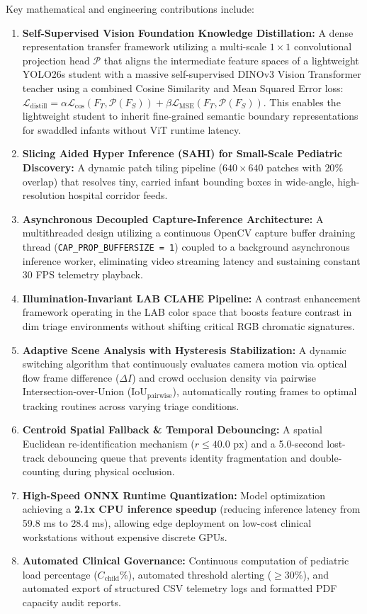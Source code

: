 Key mathematical and engineering contributions include:
\begin{enumerate}
    \item \textbf{Self-Supervised Vision Foundation Knowledge Distillation:} A dense representation transfer framework utilizing a multi-scale $1\times 1$ convolutional projection head $\mathcal{P}$ that aligns the intermediate feature spaces of a lightweight YOLO26s student with a massive self-supervised DINOv3 Vision Transformer teacher using a combined Cosine Similarity and Mean Squared Error loss: $\mathcal{L}_{\text{distill}} = \alpha \mathcal{L}_{\text{cos}}(F_T, \mathcal{P}(F_S)) + \beta \mathcal{L}_{\text{MSE}}(F_T, \mathcal{P}(F_S))$. This enables the lightweight student to inherit fine-grained semantic boundary representations for swaddled infants without ViT runtime latency.
    \item \textbf{Slicing Aided Hyper Inference (SAHI) for Small-Scale Pediatric Discovery:} A dynamic patch tiling pipeline ($640\times 640$ patches with $20\%$ overlap) that resolves tiny, carried infant bounding boxes in wide-angle, high-resolution hospital corridor feeds.
    \item \textbf{Asynchronous Decoupled Capture-Inference Architecture:} A multithreaded design utilizing a continuous OpenCV capture buffer draining thread (\texttt{CAP\_PROP\_BUFFERSIZE = 1}) coupled to a background asynchronous inference worker, eliminating video streaming latency and sustaining constant 30 FPS telemetry playback.
    \item \textbf{Illumination-Invariant LAB CLAHE Pipeline:} A contrast enhancement framework operating in the LAB color space that boosts feature contrast in dim triage environments without shifting critical RGB chromatic signatures.
    \item \textbf{Adaptive Scene Analysis with Hysteresis Stabilization:} A dynamic switching algorithm that continuously evaluates camera motion via optical flow frame difference ($\Delta I$) and crowd occlusion density via pairwise Intersection-over-Union ($\text{IoU}_{\text{pairwise}}$), automatically routing frames to optimal tracking routines across varying triage conditions.
    \item \textbf{Centroid Spatial Fallback \& Temporal Debouncing:} A spatial Euclidean re-identification mechanism ($r \le 40.0\text{ px}$) and a 5.0-second lost-track debouncing queue that prevents identity fragmentation and double-counting during physical occlusion.
    \item \textbf{High-Speed ONNX Runtime Quantization:} Model optimization achieving a \textbf{2.1x CPU inference speedup} (reducing inference latency from 59.8 ms to 28.4 ms), allowing edge deployment on low-cost clinical workstations without expensive discrete GPUs.
    \item \textbf{Automated Clinical Governance:} Continuous computation of pediatric load percentage ($C_{\text{child}}\%$), automated threshold alerting ($\ge 30\%$), and automated export of structured CSV telemetry logs and formatted PDF capacity audit reports.
\end{enumerate}

